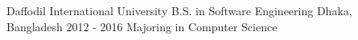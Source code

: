 

\begin{cventries}

  \cventry
  {Daffodil International University} %
    {B.S. in Software Engineering} %
    {Dhaka, Bangladesh} %
    {2012 - 2016} %
    {Majoring in Computer Science}

    
    

\end{cventries}
